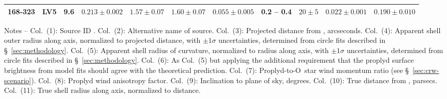 \begin{table}
\begin{tabular}{llrllllrlll}
 168-323  & LV5      &   9.6  &  $0.213 \pm 0.002$  &  $1.57 \pm 0.07$   &  $1.60 \pm 0.07$     &  $0.055 \pm 0.005$  &  0.2 -- 0.4  &  $20 \pm 5$   &  $0.022 \pm 0.001$  &  $0.190 \pm 0.010$  \\
\bottomrule
\end{tabular}
\begin{minipage}{0.95\linewidth}
  Notes --
%
  Col.~(1): Source ID \citep{ODell:1994a}.
%
  Col.~(2): Alternative name of source.
% 
  Col.~(3): Projected distance from \thC{}, arcseconds.
%
  Col.~(4): Apparent shell outer radius along axis, normalized to
  projected distance, with \(\pm 1\sigma\) uncertainties, determined
  from circle fits described in \S~\ref{sec:methodology}.
% 
  Col.~(5): Apparent shell radius of curvature, normalized to radius
  along axis, with \(\pm 1\sigma\) uncertainties, determined from
  circle fits described in \S~\ref{sec:methodology}.
% 
  Col.~(6): As Col.~(5) but applying the additional requirement that
  the proplyd surface brightness from model fits should agree with the
  theoretical prediction.
%
  Col.~(7): Proplyd-to-O~star wind momentum ratio (see \S~\ref{sec:crw-scenario}). 
% 
  Col.~(8): Proplyd wind anisotropy factor.
% 
  Col.~(9): Inclination to plane of sky, degrees.
% 
  Col.~(10): True distance from \thC{}, parsecs.
%
  Col.~(11): True shell radius along axis, normalized to distance.

\end{minipage}
\end{table}

%




